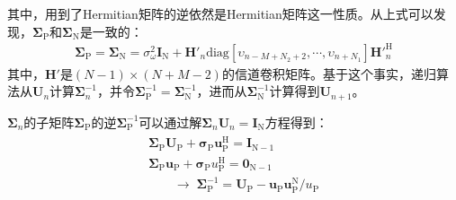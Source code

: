 其中，用到了Hermitian矩阵的逆依然是Hermitian矩阵这一性质。从上式可以发现，$\boldsymbol{\Sigma}_{\mathrm{P}}$和$\boldsymbol{\Sigma}_{\mathrm{N}}$是一致的：
\begin{eqnarray}
    \boldsymbol{\Sigma}_{\mathrm{P}}=\boldsymbol{\Sigma}_{\mathrm{N}}=\sigma_{\omega}^2\mathbf{I}_{\mathrm{N}}+{\mathbf{H}}'_n\mathrm{diag}[\upsilon_{n-M+N_2+2},\cdots,\upsilon_{n+N_1}]{{\mathbf{H}}'}_n^{\mathrm{H}}
    \label{equ:3.26}
\end{eqnarray}
其中，${\mathbf{H}}'$是$(N-1)\times(N+M-2)$的信道卷积矩阵。基于这个事实，递归算法从$\mathbf{U}_n$计算$\boldsymbol{\Sigma}_n^{-1}$，并令$\boldsymbol{\Sigma}_{\mathrm{P}}^{-1}=\boldsymbol{\Sigma}_{\mathrm{N}}^{-1}$，进而从$\boldsymbol{\Sigma}_{\mathrm{N}}^{-1}$计算得到$\mathbf{U}_{n+1}$。

$\boldsymbol{\Sigma}_{n}$的子矩阵$\boldsymbol{\Sigma}_{\mathrm{P}}$的逆$\boldsymbol{\Sigma}_{\mathrm{P}}^{-1}$可以通过解$\boldsymbol{\Sigma}_{n}\mathbf{U}_n=\mathbf{I}_{\mathrm{N}}$方程得到：
\begin{eqnarray}
    \begin{array}{c}
        \boldsymbol{\Sigma}_{\mathrm{P}}\mathbf{U}_{\mathrm{P}}+\boldsymbol{\sigma}_{\mathrm{P}}\mathbf{u}_{\mathrm{P}}^{\mathrm{H}}=\mathbf{I}_{\mathrm{N}-1}\\
     \boldsymbol{\Sigma}_{\mathrm{P}}\mathbf{u}_{\mathrm{P}}+\boldsymbol{\sigma}_{\mathrm{P}}u_{\mathrm{P}}^{\mathrm{H}}=\mathbf{0}_{\mathrm{N}-1}\\
     \qquad\rightarrow\;\boldsymbol{\Sigma}_{\mathrm{P}}^{-1}=\mathbf{U}_{\mathrm{P}}-\mathbf{u}_{\mathrm{P}}\mathbf{u}_{\mathrm{P}}^{\mathrm{N}}/u_{\mathrm{P}}
    \end{array}
    \label{equ:3.27}
\end{eqnarray}

